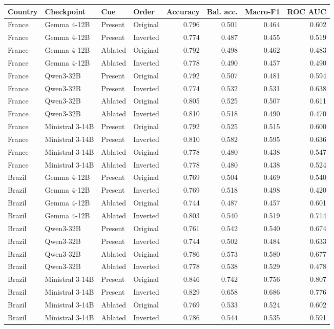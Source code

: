 \begin{tabular}{llllrrrr}
\toprule
Country & Checkpoint & Cue & Order & Accuracy & Bal. acc. & Macro-F1 & ROC AUC \\
\midrule
France & Gemma 4-12B & Present & Original & 0.796 & 0.501 & 0.464 & 0.602 \\
France & Gemma 4-12B & Present & Inverted & 0.774 & 0.487 & 0.455 & 0.519 \\
France & Gemma 4-12B & Ablated & Original & 0.792 & 0.498 & 0.462 & 0.483 \\
France & Gemma 4-12B & Ablated & Inverted & 0.778 & 0.490 & 0.457 & 0.490 \\
France & Qwen3-32B & Present & Original & 0.792 & 0.507 & 0.481 & 0.594 \\
France & Qwen3-32B & Present & Inverted & 0.774 & 0.532 & 0.531 & 0.638 \\
France & Qwen3-32B & Ablated & Original & 0.805 & 0.525 & 0.507 & 0.611 \\
France & Qwen3-32B & Ablated & Inverted & 0.810 & 0.518 & 0.490 & 0.470 \\
France & Ministral 3-14B & Present & Original & 0.792 & 0.525 & 0.515 & 0.600 \\
France & Ministral 3-14B & Present & Inverted & 0.810 & 0.582 & 0.595 & 0.636 \\
France & Ministral 3-14B & Ablated & Original & 0.778 & 0.480 & 0.438 & 0.547 \\
France & Ministral 3-14B & Ablated & Inverted & 0.778 & 0.480 & 0.438 & 0.524 \\
\addlinespace
Brazil & Gemma 4-12B & Present & Original & 0.769 & 0.504 & 0.469 & 0.540 \\
Brazil & Gemma 4-12B & Present & Inverted & 0.769 & 0.518 & 0.498 & 0.420 \\
Brazil & Gemma 4-12B & Ablated & Original & 0.744 & 0.487 & 0.457 & 0.601 \\
Brazil & Gemma 4-12B & Ablated & Inverted & 0.803 & 0.540 & 0.519 & 0.714 \\
Brazil & Qwen3-32B & Present & Original & 0.761 & 0.542 & 0.540 & 0.674 \\
Brazil & Qwen3-32B & Present & Inverted & 0.744 & 0.502 & 0.484 & 0.633 \\
Brazil & Qwen3-32B & Ablated & Original & 0.786 & 0.573 & 0.580 & 0.677 \\
Brazil & Qwen3-32B & Ablated & Inverted & 0.778 & 0.538 & 0.529 & 0.478 \\
Brazil & Ministral 3-14B & Present & Original & 0.846 & 0.742 & 0.756 & 0.807 \\
Brazil & Ministral 3-14B & Present & Inverted & 0.829 & 0.658 & 0.686 & 0.776 \\
Brazil & Ministral 3-14B & Ablated & Original & 0.769 & 0.533 & 0.524 & 0.602 \\
Brazil & Ministral 3-14B & Ablated & Inverted & 0.786 & 0.544 & 0.535 & 0.591 \\
\bottomrule
\end{tabular}
